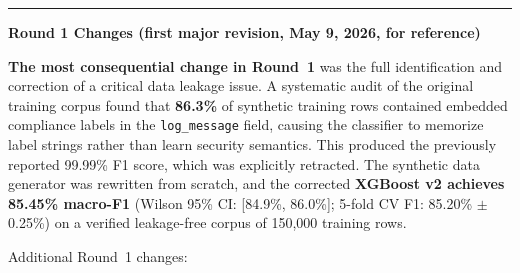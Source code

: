\documentclass[12pt, a4paper]{article}
\begin{document}
\vspace{0.4cm}
\noindent\rule{\textwidth}{0.4pt}
\vspace{0.2cm}

\noindent\textbf{\large Round 1 Changes (first major revision, May 9, 2026, for reference)}

\vspace{0.2cm}
\noindent\textbf{The most consequential change in Round~1} was the full identification and
correction of a critical data leakage issue. A systematic audit of the original training
corpus found that \textbf{86.3\%} of synthetic training rows contained embedded compliance
labels in the \texttt{log\_message} field, causing the classifier to memorize label strings
rather than learn security semantics. This produced the previously reported 99.99\% F1
score, which was explicitly retracted. The synthetic data generator was rewritten from
scratch, and the corrected \textbf{XGBoost v2 achieves 85.45\% macro-F1}
(Wilson 95\% CI: [84.9\%, 86.0\%]; 5-fold CV F1: 85.20\% $\pm$ 0.25\%) on a
verified leakage-free corpus of 150{,}000 training rows.

Additional Round~1 changes:
\end{document}
